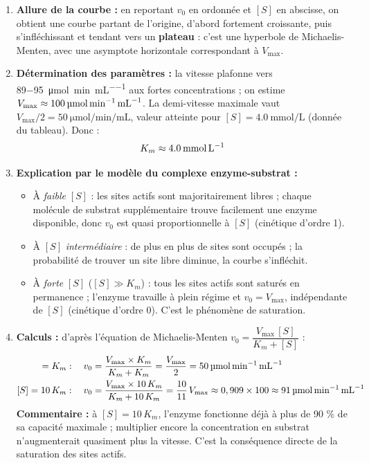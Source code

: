 \documentclass[11pt]{article}
\newcommand{\cle}[1]{{\popxbold\color{popdark}#1}}
\begin{document}
\begin{corrige}[{Exercice 8 — Construction et interprétation : $v_0 = f({[S]})$}]
\begin{enumerate}
    \item \textbf{Allure de la courbe :} en reportant $v_0$ en ordonnée et $[S]$ en abscisse, on obtient une courbe partant de l'origine, d'abord fortement croissante, puis s'infléchissant et tendant vers un \textbf{plateau} : c'est une \cle{hyperbole} de Michaelis-Menten, avec une asymptote horizontale correspondant à $V_{\text{max}}$.
    \item \textbf{Détermination des paramètres :} la vitesse plafonne vers \SI{89-95}{\micro\mol\per\minute\per\mL} aux fortes concentrations ; on estime $V_{\text{max}} \approx \textbf{\SI{100}{\micro\mol\per\minute\per\mL}}$. La demi-vitesse maximale vaut $V_{\text{max}}/2 = \SI{50}{\micro\mol\per\minute\per\mL}$, valeur atteinte pour $[S] = \SI{4,0}{\mmol\per\liter}$ (donnée du tableau). Donc :
    \[ K_m \approx \textbf{\SI{4,0}{\mmol\per\liter}} \]
    \item \textbf{Explication par le modèle du complexe enzyme-substrat :}
    \begin{itemize}
        \item À \emph{faible} $[S]$ : les sites actifs sont majoritairement libres ; chaque molécule de substrat supplémentaire trouve facilement une enzyme disponible, donc $v_0$ est quasi proportionnelle à $[S]$ (cinétique d'ordre 1).
        \item À $[S]$ \emph{intermédiaire} : de plus en plus de sites sont occupés ; la probabilité de trouver un site libre diminue, la courbe s'infléchit.
        \item À \emph{forte} $[S]$ ($[S] \gg K_m$) : tous les sites actifs sont saturés en permanence ; l'enzyme travaille à plein régime et $v_0 = V_{\text{max}}$, indépendante de $[S]$ (cinétique d'ordre 0). C'est le phénomène de \cle{saturation}.
    \end{itemize}
    \item \textbf{Calculs :} d'après l'équation de Michaelis-Menten $v_0 = \dfrac{V_{\text{max}}\,[S]}{K_m + [S]}$ :
    \begin{align*}
    [S] = K_m : \quad v_0 &= \frac{V_{\text{max}} \times K_m}{K_m + K_m} = \frac{V_{\text{max}}}{2} = \textbf{\SI{50}{\micro\mol\per\minute\per\mL}} \\
    [S] = 10\,K_m : \quad v_0 &= \frac{V_{\text{max}} \times 10\,K_m}{K_m + 10\,K_m} = \frac{10}{11}\,V_{\text{max}} \approx 0,909 \times 100 \approx \textbf{\SI{91}{\micro\mol\per\minute\per\mL}}
    \end{align*}
    \textbf{Commentaire :} à $[S] = 10\,K_m$, l'enzyme fonctionne déjà à plus de 90 \% de sa capacité maximale ; multiplier encore la concentration en substrat n'augmenterait quasiment plus la vitesse. C'est la conséquence directe de la saturation des sites actifs.
\end{enumerate}
\end{corrige}
\end{document}
